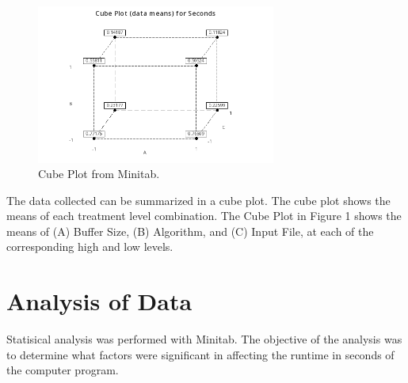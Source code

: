 \documentclass{article}
\begin{document}
  \begin{figure}[h] %
    \centering
    \includegraphics[width=0.7\textwidth]{./images/cube.png}
    \caption{Cube Plot from Minitab.}
    \label{fig:interaction}
  \end{figure}
  The data collected can be summarized in a cube plot.
  The cube plot shows the means of each treatment level combination.
  The Cube Plot in Figure 1 shows the means of (A) Buffer Size, (B) Algorithm, and (C) Input File, at each of the corresponding high and low levels.

\clearpage
\section{Analysis of Data}

  Statisical analysis was performed with Minitab.
  The objective of the analysis was to determine what factors were
  significant in affecting the runtime in seconds of the computer program.
\end{document}
